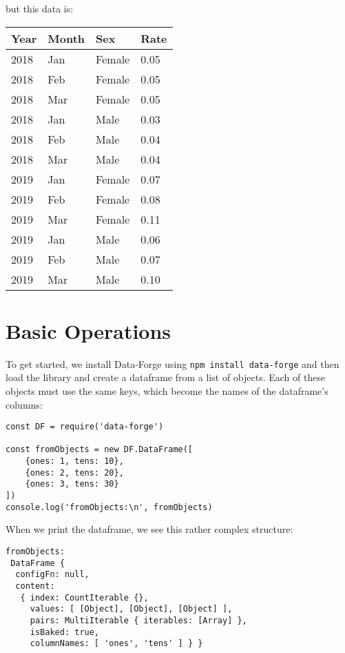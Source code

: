 \noindent
but this data is:

\begin{longtable}{|l|l|l|l|}
  \hline
  Year & Month & Sex & Rate \\
  \hline
  2018 & Jan & Female & 0.05 \\
  \hline
  2018 & Feb & Female & 0.05 \\
  \hline
  2018 & Mar & Female & 0.05 \\
  \hline
  2018 & Jan & Male & 0.03 \\
  \hline
  2018 & Feb & Male & 0.04 \\
  \hline
  2018 & Mar & Male & 0.04 \\
  \hline
  2019 & Jan & Female & 0.07 \\
  \hline
  2019 & Feb & Female & 0.08 \\
  \hline
  2019 & Mar & Female & 0.11 \\
  \hline
  2019 & Jan & Male & 0.06 \\
  \hline
  2019 & Feb & Male & 0.07 \\
  \hline
  2019 & Mar & Male & 0.10 \\
  \hline
\end{longtable}

\section{Basic Operations}\label{s:dataforge-basics}

To get started,
we install Data-Forge using \texttt{npm install data-forge}
and then load the library and create a dataframe from a list of objects.
Each of these objects must use the same keys,
which become the names of the dataframe's columns:

\begin{verbatim}
const DF = require('data-forge')

const fromObjects = new DF.DataFrame([
    {ones: 1, tens: 10},
    {ones: 2, tens: 20},
    {ones: 3, tens: 30}
])
console.log('fromObjects:\n', fromObjects)
\end{verbatim}

When we print the dataframe,
we see this rather complex structure:

\begin{verbatim}
fromObjects:
 DataFrame {
  configFn: null,
  content:
   { index: CountIterable {},
     values: [ [Object], [Object], [Object] ],
     pairs: MultiIterable { iterables: [Array] },
     isBaked: true,
     columnNames: [ 'ones', 'tens' ] } }
\end{verbatim}

